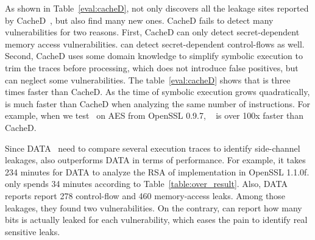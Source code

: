 As shown in Table~\ref{eval:cacheD},
\tool{} not only discovers all the leakage sites reported by CacheD~\cite{203878}, but also
find many new ones. CacheD fails to detect many vulnerabilities for two
reasons. First, CacheD can only detect secret-dependent memory access
vulnerabilities. \tool{} can detect secret-dependent control-flows as well.
Second, CacheD uses some domain
knowledge to simplify symbolic execution to trim the traces before
processing, which does not introduce false positives, but can neglect some
vulnerabilities. The table~\ref{eval:cacheD} shows that
\tool{} is three times faster than CacheD. As the time of symbolic execution
grows quadratically, \tool{} is much faster than CacheD when analyzing the same
number of instructions. For example, when we test~\tool{} on AES from OpenSSL
0.9.7, ~\tool{} is over 100x faster than CacheD.

Since DATA~\cite{217537} need to compare several execution traces to identify
side-channel leakages, \tool{} also outperforms DATA in terms of performance.
For example, it takes 234 minutes for DATA to analyze the RSA of implementation
in OpenSSL 1.1.0f. \tool{} only spends 34 minutes according to Table~\ref{table:over_result}.
Also, DATA reports report 278 control-flow and 460 memory-access leaks. Among those leakages,
they found two vulnerabilities. On the contrary, \tool{} can report how many bits is
actually leaked for each vulnerability, which eases the pain to identify real sensitive leaks.

